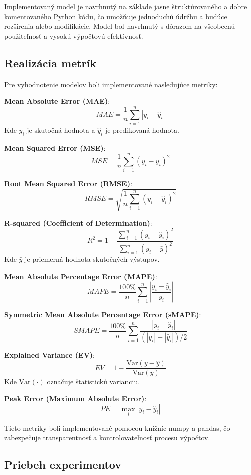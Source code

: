 Implementovaný model je navrhnutý na základe jasne štruktúrovaného a dobre komentovaného Python kódu, čo umožňuje jednoduchú údržbu a budúce rozšírenia alebo modifikácie. Model bol navrhnutý s dôrazom na všeobecnú použiteľnosť a vysokú výpočtovú efektívnosť.

\newpage
\subsection{Realizácia metrík}
\label{sec:metrics}
Pre vyhodnotenie modelov boli implementované nasledujúce metriky:

\textbf{Mean Absolute Error (MAE)\label{mae}}: \[ MAE = \frac{1}{n} \sum_{i=1}^{n} \left| y_i - \hat{y}_i \right| \] Kde \( y_i \) je skutočná hodnota a \( \hat{y}_i \) je predikovaná hodnota.

\textbf{Mean Squared Error (MSE)\label{mse}}: \[ MSE = \frac{1}{n} \sum_{i=1}^{n} (y_i - \hat{y}_i)^2 \]

\textbf{Root Mean Squared Error (RMSE)\label{rmse}}: \[ RMSE = \sqrt{ \frac{1}{n} \sum_{i=1}^{n} (y_i - \hat{y}_i)^2 } \]

\textbf{R-squared (Coefficient of Determination)\label{r2}}: \[ R^2 = 1 - \frac{\sum_{i=1}^{n} (y_i - \hat{y}_i)^2}{\sum_{i=1}^{n} (y_i - \bar{y})^2} \] Kde \( \bar{y} \) je priemerná hodnota skutočných výstupov.

\textbf{Mean Absolute Percentage Error (MAPE)\label{mape}}: \[ MAPE = \frac{100\%}{n} \sum_{i=1}^{n} \left| \frac{y_i - \hat{y}_i}{y_i} \right| \]

\textbf{Symmetric Mean Absolute Percentage Error (sMAPE)\label{smape}}: \[ SMAPE = \frac{100\%}{n} \sum_{i=1}^{n} \frac{ \left| y_i - \hat{y}_i \right| }{ \left( |y_i| + |\hat{y}_i| \right) / 2 } \]

\textbf{Explained Variance (EV)\label{ev}}: \[ EV = 1 - \frac{\mathrm{Var}(y - \hat{y})}{\mathrm{Var}(y)} \] Kde \( \mathrm{Var}(\cdot) \) označuje štatistickú varianciu.

\textbf{Peak Error (Maximum Absolute Error)\label{pe}}: \[ PE = \max_{i} \left| y_i - \hat{y}_i \right| \]

Tieto metriky boli implementované pomocou knižníc numpy a pandas, čo zabezpečuje transparentnosť a kontrolovateľnosť procesu výpočtov.

\subsection{Priebeh experimentov}

